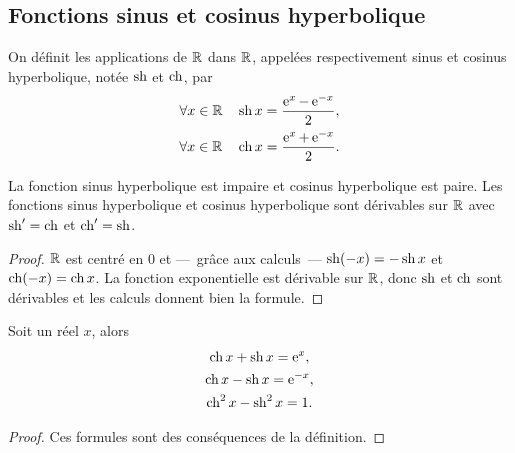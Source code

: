 \subsection{Fonctions sinus et cosinus hyperbolique}
\label{subsec:chap1-sinushetcosh}
\begin{defdef}
  On définit les applications de $\mathbb{R}$ dans $\mathbb{R}$, appelées respectivement sinus et cosinus hyperbolique, notée $\operatorname{sh}$ et $\operatorname{ch}$, par
  \begin{gather}
    \forall x \in \mathbb{R} \quad \operatorname{sh} x = \frac{\operatorname{e}^x - \operatorname{e}^{-x}}{2}, \\
    \forall x \in \mathbb{R} \quad \operatorname{ch} x = \frac{\operatorname{e}^x + \operatorname{e}^{-x}}{2}.
  \end{gather}
\end{defdef}
%
\begin{prop}
  La fonction sinus hyperbolique est impaire et cosinus hyperbolique est paire. Les fonctions sinus hyperbolique et cosinus hyperbolique sont dérivables sur $\mathbb{R}$ avec $\operatorname{sh}'=\operatorname{ch}$ et $\operatorname{ch}'=\operatorname{sh}$.
\end{prop}
\begin{proof}
  $\mathbb{R}$ est centré en $0$ et ---~grâce aux calculs~--- $\operatorname{sh}(-x)=-\operatorname{sh} x$ et $\operatorname{ch}(-x)=\operatorname{ch} x$. La fonction exponentielle est dérivable sur $\mathbb{R}$, donc $\operatorname{sh}$ et $\operatorname{ch}$ sont dérivables et les calculs donnent bien la formule.
\end{proof}
%
\begin{prop} Soit un réel $x$, alors
\begin{gather}
  \operatorname{ch} x + \operatorname{sh} x = \operatorname{e}^x, \\
  \operatorname{ch} x - \operatorname{sh} x = \operatorname{e}^{-x}, \\
  \operatorname{ch}^2 x - \operatorname{sh}^2 x = 1.
\end{gather}
\end{prop}
\begin{proof}
  Ces formules sont des conséquences de la définition.
\end{proof}
%

